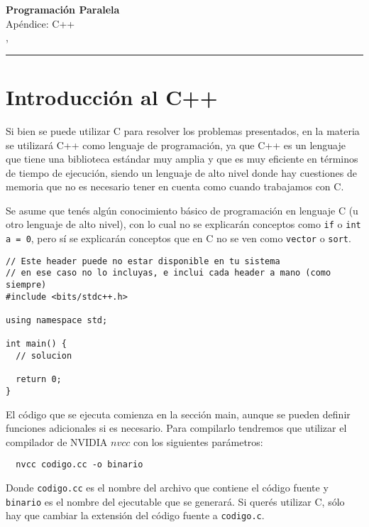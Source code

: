 



\begin{center}
    \LARGE\textbf{Programación Paralela} \\
    \Large{Apéndice: C++} \\
    \normalsize{\currentsemester, \currentyear} \\
    \vspace{1em}
    \hrule
\end{center}

\section{Introducción al C++}

Si bien se puede utilizar C para resolver los problemas presentados, en la materia se utilizará C++ como lenguaje de
programación, ya que C++ es un lenguaje que tiene una biblioteca estándar muy amplia y que es muy eficiente en términos
de tiempo de ejecución, siendo un lenguaje de alto nivel donde hay cuestiones de memoria que no es necesario tener en
cuenta como cuando trabajamos con C.

Se asume que tenés algún conocimiento básico de programación en lenguaje C (u otro lenguaje de alto nivel), con lo cual
no se explicarán conceptos como \texttt{if} o \texttt{int a = 0}, pero sí se explicarán conceptos que en C no se ven
como \texttt{vector} o \texttt{sort}.

\begin{lstlisting}
// Este header puede no estar disponible en tu sistema
// en ese caso no lo incluyas, e inclui cada header a mano (como siempre)
#include <bits/stdc++.h>

using namespace std;

int main() {
  // solucion

  return 0;
}
\end{lstlisting}

El código que se ejecuta comienza en la sección main, aunque se pueden definir funciones adicionales si es necesario.
Para compilarlo tendremos que utilizar el compilador de NVIDIA $nvcc$ con los siguientes parámetros:

\begin{lstlisting}
  nvcc codigo.cc -o binario
\end{lstlisting}

Donde \texttt{codigo.cc} es el nombre del archivo que contiene el código fuente y \texttt{binario} es el nombre
del ejecutable que se generará. Si querés utilizar C, sólo hay que cambiar la extensión del código fuente a
\texttt{codigo.c}.


